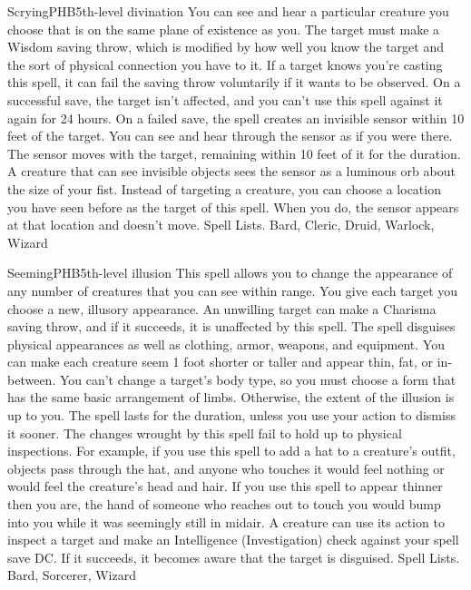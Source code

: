 \begin{spell}{Scrying}{PHB}{5th-level divination}
{
}
You can see and hear a particular creature you choose that is on the same plane of existence as you. The target must make a Wisdom saving throw, which is modified by how well you know the target and the sort of physical connection you have to it. If a target knows you’re casting this spell, it can fail the saving throw voluntarily if it wants to be observed.
On a successful save, the target isn’t affected, and you can’t use this spell against it again for 24 hours.
On a failed save, the spell creates an invisible sensor within 10 feet of the target. You can see and hear through the sensor as if you were there. The sensor moves with the target, remaining within 10 feet of it for the duration. A creature that can see invisible objects sees the sensor as a luminous orb about the size of your fist.
Instead of targeting a creature, you can choose a location you have seen before as the target of this spell. When you do, the sensor appears at that location and doesn’t move.
Spell Lists. Bard, Cleric, Druid, Warlock, Wizard
\end{spell}

\begin{spell}{Seeming}{PHB}{5th-level illusion}
{
}
This spell allows you to change the appearance of any number of creatures that you can see within range. You give each target you choose a new, illusory appearance. An unwilling target can make a Charisma saving throw, and if it succeeds, it is unaffected by this spell.
The spell disguises physical appearances as well as clothing, armor, weapons, and equipment. You can make each creature seem 1 foot shorter or taller and appear thin, fat, or in-between. You can’t change a target’s body type, so you must choose a form that has the same basic arrangement of limbs. Otherwise, the extent of the illusion is up to you. The spell lasts for the duration, unless you use your action to dismiss it sooner.
The changes wrought by this spell fail to hold up to physical inspections. For example, if you use this spell to add a hat to a creature’s outfit, objects pass through the hat, and anyone who touches it would feel nothing or would feel the creature’s head and hair. If you use this spell to appear thinner then you are, the hand of someone who reaches out to touch you would bump into you while it was seemingly still in midair.
A creature can use its action to inspect a target and make an Intelligence (Investigation) check against your spell save DC. If it succeeds, it becomes aware that the target is disguised.
Spell Lists. Bard, Sorcerer, Wizard
\end{spell}

